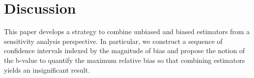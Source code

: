 \documentclass[11pt]{article}
\newcommand{\htau}{\widehat\tau}
\numberwithin{equation}{section}
\theoremstyle{definition}
\begin{document}


\section{Discussion}\label{sec:discussion}

This paper develops a strategy to combine unbiased and biased estimators from
a sensitivity analysis perspective. In particular, we construct a sequence of confidence intervals indexed by the
magnitude of bias and propose the notion of the b-value to quantify the maximum relative bias so that combining estimators yields an insignificant result. 
\end{document}
